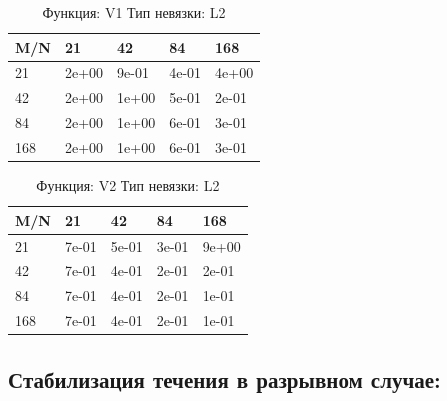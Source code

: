 \documentclass[a4paper,11pt]{article}
\begin{document}
\begin{table}[H]
\caption {Функция: V1 Тип невязки: L2  }
\begin{center}
\begin{tabular}{l|l|l|l|l}
\hline
M/N  & 21 & 42 & 84 & 168 \\ \hline
  21 & 2e+00& 9e-01& 4e-01& 4e+00\\ \hline
  42 & 2e+00& 1e+00& 5e-01& 2e-01\\ \hline
  84 & 2e+00& 1e+00& 6e-01& 3e-01\\ \hline
 168 & 2e+00& 1e+00& 6e-01& 3e-01\\ \hline
\end{tabular}
\end{center}
\end{table}
\begin{table}[H]
\caption {Функция: V2 Тип невязки: L2  }
\begin{center}
\begin{tabular}{l|l|l|l|l}
\hline
M/N  & 21 & 42 & 84 & 168 \\ \hline
  21 & 7e-01& 5e-01& 3e-01& 9e+00\\ \hline
  42 & 7e-01& 4e-01& 2e-01& 2e-01\\ \hline
  84 & 7e-01& 4e-01& 2e-01& 1e-01\\ \hline
 168 & 7e-01& 4e-01& 2e-01& 1e-01\\ \hline
\end{tabular}
\end{center}
\end{table}

\newpage
\subsection{Стабилизация течения в разрывном случае:}

\newpage
\end{document}
